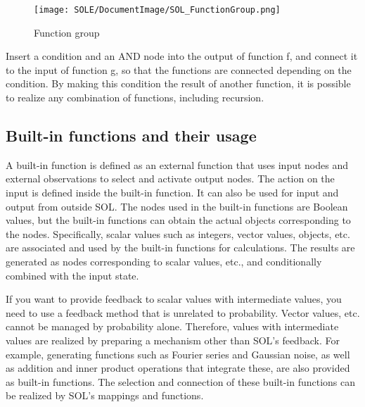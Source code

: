 \documentclass[12pt]{article}
\begin{document}
\begin{figure}[ht]
  \centering
  \texttt{[image: SOLE/DocumentImage/SOL\_FunctionGroup.png]}
  \caption{Function group}
  \label{fig:function_group}
\end{figure}

Insert a condition and an AND node into the output of function f, and
connect it to the input of function g, so that the functions are
connected depending on the condition. By making this condition the
result of another function, it is possible to realize any combination of
functions, including recursion.

\subsection{Built-in functions and their
usage}\label{built-in-functions-and-their-usage}

A built-in function is defined as an external function that uses input
nodes and external observations to select and activate output nodes. The
action on the input is defined inside the built-in function. It can also
be used for input and output from outside SOL. The nodes used in the
built-in functions are Boolean values, but the built-in functions can
obtain the actual objects corresponding to the nodes. Specifically,
scalar values \hspace{0pt}\hspace{0pt}such as integers, vector values,
objects, etc. are associated and used by the built-in functions for
calculations. The results are generated as nodes corresponding to scalar
values, etc., and conditionally combined with the input state.

If you want to provide feedback to scalar values
\hspace{0pt}\hspace{0pt}with intermediate values, you need to use a
feedback method that is unrelated to probability. Vector values, etc.
cannot be managed by probability alone. Therefore, values
\hspace{0pt}\hspace{0pt}with intermediate values
\hspace{0pt}\hspace{0pt}are realized by preparing a mechanism other than
SOL's feedback. For example, generating functions such as Fourier series
and Gaussian noise, as well as addition and inner product operations
that integrate these, are also provided as built-in functions. The
selection and connection of these built-in functions can be realized by
SOL's mappings and functions.
\end{document}
